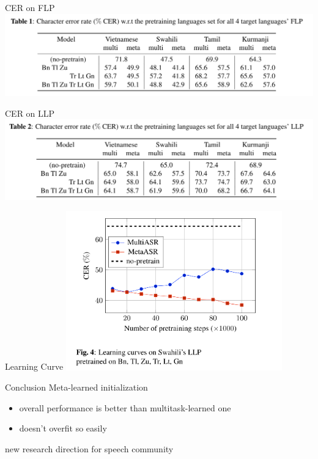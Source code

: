 \documentclass{beamer}
\begin{document}
\begin{frame}[t]{CER on FLP}
  \center \includegraphics[width=1.0\textwidth]{fig/flp_table.png}
\end{frame}

\begin{frame}[t]{CER on LLP}
  \center \includegraphics[width=1.0\textwidth]{fig/llp_table.png}
\end{frame}

\begin{frame}[t]{Learning Curve}
  \center \includegraphics[width=0.7\textwidth]{fig/lr.png}
\end{frame}

\begin{frame}[t]{Conclusion}
  Meta-learned initialization
  \begin{itemize}
    \item overall performance is better than multitask-learned one
    \item doesn't overfit so easily
  \end{itemize}
  \pause
  \vspace{3em}
  \center new research direction for speech community
\end{frame}
\end{document}
